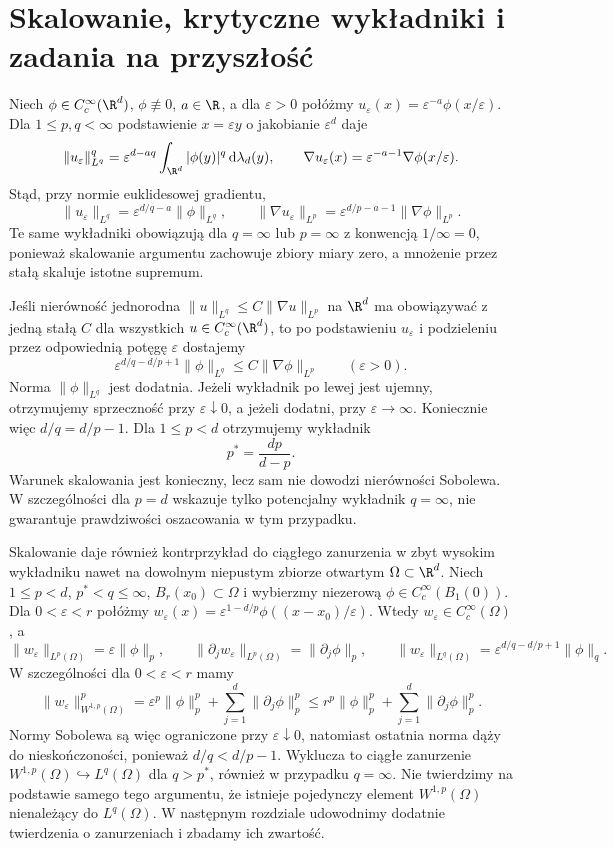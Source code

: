 \section{Skalowanie, krytyczne wykładniki i zadania na przyszłość}
\label{sec:pde9-scaling}

Niech $\phi\in C_c^\infty(\R^d)$, $\phi\not\equiv0$,
$a\in\R$, a dla $\varepsilon>0$ połóżmy
$u_\varepsilon(x)=\varepsilon^{-a}\phi(x/\varepsilon)$.
Dla $1\le p,q<\infty$ podstawienie $x=\varepsilon y$
o jakobianie $\varepsilon^d$ daje
\[
 \|u_\varepsilon\|_{L^q}^q
 =\varepsilon^{d-aq}\int_{\R^d}|\phi(y)|^q\,\mathrm d\lambda_d(y),
 \qquad
 \nabla u_\varepsilon(x)=\varepsilon^{-a-1}\nabla\phi(x/\varepsilon).
\]
Stąd, przy normie euklidesowej gradientu,
\[
 \|u_\varepsilon\|_{L^q}
 =\varepsilon^{d/q-a}\|\phi\|_{L^q},\qquad
 \|\nabla u_\varepsilon\|_{L^p}
 =\varepsilon^{d/p-a-1}\|\nabla\phi\|_{L^p}.
\]
Te same wykładniki obowiązują dla $q=\infty$ lub
$p=\infty$ z konwencją $1/\infty=0$, ponieważ
skalowanie argumentu zachowuje zbiory miary zero,
a mnożenie przez stałą skaluje istotne supremum.

Jeśli nierówność jednorodna
$\|u\|_{L^q}\le C\|\nabla u\|_{L^p}$ na $\R^d$
ma obowiązywać z jedną stałą $C$ dla wszystkich
$u\in C_c^\infty(\R^d)$, to po podstawieniu
$u_\varepsilon$ i podzieleniu przez odpowiednią
potęgę $\varepsilon$ dostajemy
\[
 \varepsilon^{d/q-d/p+1}\|\phi\|_{L^q}
 \le C\|\nabla\phi\|_{L^p}\qquad(\varepsilon>0).
\]
Norma $\|\phi\|_{L^q}$ jest dodatnia. Jeżeli wykładnik
po lewej jest ujemny, otrzymujemy sprzeczność przy
$\varepsilon\downarrow0$, a jeżeli dodatni,
przy $\varepsilon\to\infty$. Koniecznie więc
$d/q=d/p-1$. Dla $1\le p<d$ otrzymujemy wykładnik
\[
 p^*=\frac{dp}{d-p}.
\]
Warunek skalowania jest konieczny, lecz sam nie dowodzi
nierówności Sobolewa. W szczególności dla $p=d$ wskazuje
tylko potencjalny wykładnik $q=\infty$, nie gwarantuje
prawdziwości oszacowania w tym przypadku.

Skalowanie daje również kontrprzykład do ciągłego
zanurzenia w zbyt wysokim wykładniku nawet na dowolnym
niepustym zbiorze otwartym $\Omega\subset\R^d$.
Niech $1\le p<d$, $p^*<q\le\infty$,
$B_r(x_0)\subset\Omega$ i wybierzmy niezerową
$\phi\in C_c^\infty(B_1(0))$. Dla $0<\varepsilon<r$
połóżmy
$w_\varepsilon(x)=\varepsilon^{1-d/p}
\phi((x-x_0)/\varepsilon)$.
Wtedy $w_\varepsilon\in C_c^\infty(\Omega)$, a
\[
 \|w_\varepsilon\|_{L^p(\Omega)}=\varepsilon\|\phi\|_p,
 \qquad
 \|\partial_j w_\varepsilon\|_{L^p(\Omega)}
 =\|\partial_j\phi\|_p,\qquad
 \|w_\varepsilon\|_{L^q(\Omega)}
 =\varepsilon^{d/q-d/p+1}\|\phi\|_q.
\]
W szczególności dla $0<\varepsilon<r$ mamy
\[
 \|w_\varepsilon\|_{W^{1,p}(\Omega)}^p
 =\varepsilon^p\|\phi\|_p^p+
       \sum_{j=1}^d\|\partial_j\phi\|_p^p
 \le r^p\|\phi\|_p^p+\sum_{j=1}^d\|\partial_j\phi\|_p^p.
\]
Normy Sobolewa są więc ograniczone przy $\varepsilon\downarrow0$,
natomiast ostatnia norma dąży do nieskończoności,
ponieważ $d/q<d/p-1$. Wyklucza to ciągłe
zanurzenie $W^{1,p}(\Omega)\hookrightarrow L^q(\Omega)$
dla $q>p^*$, również w przypadku $q=\infty$.
Nie twierdzimy na podstawie samego tego argumentu,
że istnieje pojedynczy element $W^{1,p}(\Omega)$
nienależący do $L^q(\Omega)$. W następnym rozdziale
udowodnimy dodatnie twierdzenia o zanurzeniach
i zbadamy ich zwartość.

